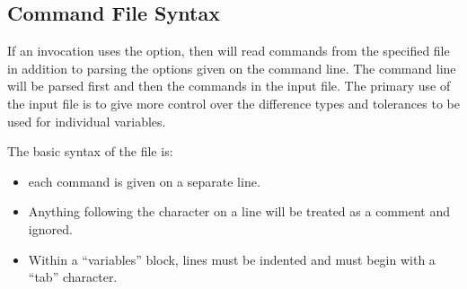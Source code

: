\subsection{\exodiff{} Command File Syntax}\label{ed:command_file}

If an \exodiff{} invocation uses the  option,
then \exodiff{} will read commands from the specified file in addition
to parsing the options given on the command line.  The command line
will be parsed first and then the commands in the input file.  The
primary use of the input file is to give more control over the
difference types and tolerances to be used for individual variables.

The basic syntax of the file is:
\begin{itemize}

\item each command is given on a separate line.

\item Anything following the \param{\#} character on a line
will be treated as a comment and ignored.

\item Within a ``variables'' block, lines must be indented and must begin with a ``tab'' character.
\end{itemize}

